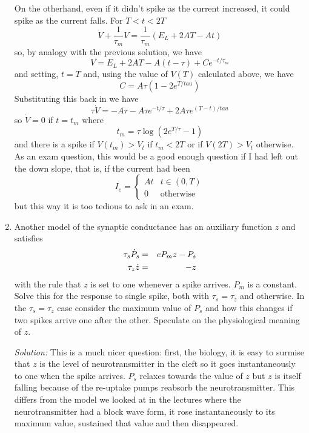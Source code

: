 \documentclass[12pt]{article}
\newcommand\soln{\noindent\textit{Solution:} }
\begin{document}
\begin{enumerate}
On the otherhand, even if it didn't spike as the current increased, it could spike as the current falls. For $T<t<2T$ 
\begin{equation}
\dot{V}+\frac{1}{\tau_m}V=\frac{1}{\tau_m}\left(E_L+2AT-At\right)
\end{equation}
so, by analogy with the previous solution, we have
\begin{equation}
V=E_L+2AT-A(t-\tau)+Ce^{-t/\tau_m}
\end{equation}
and setting, $t=T$ and, using the value of $V(T)$ calculated above, we have 
\begin{equation}
C=A\tau\left(1-2e^{T/tau}\right)
\end{equation}
Substituting this back in we have
\begin{equation}
\tau\dot{V}=-A\tau-A\tau e^{-t/\tau}+2A\tau e^{(T-t)/tau}
\end{equation}
so $\dot{V}=0$ if $t=t_m$ where
\begin{equation}
t_m=\tau\log{\left(2e^{T/\tau}-1\right)}
\end{equation}
and there is a spike if $V(t_m)>V_t$ if $t_m<2T$ or if $V(2T)>V_t$
otherwise. As an exam question, this would be a good enough question
if I had left out the down slope, that is, if the current had been
\begin{equation}
I_e=\left\{\begin{array}{ll}At&t\in(0,T)\\
0&\mbox{otherwise}
\end{array}\right.
\end{equation}
but this way it is too tedious to ask in an exam.

\item Another model of the synaptic conductance has an auxiliary function $z$ and satisfies
\begin{eqnarray}
\tau_s\dot{P}_s&=&eP_mz-P_s\cr
\tau_z\dot{z}&=&-z
\end{eqnarray}
with the rule that $z$ is set to one whenever a spike arrives. $P_m$ is a constant. Solve this for the response to single spike, both with $\tau_s=\tau_z$ and otherwise. In the $\tau_s=\tau_z$ case consider the maximum value of $P_s$ and how this changes if two spikes arrive one after the other. Speculate on the physiological meaning of $z$.

\soln This is a much nicer question: first, the biology, it is easy to surmise that $z$ is the level of neurotransmitter in the cleft so it goes instantaneously to one when the spike arrives. $P_s$ relaxes towards the value of $z$ but $z$ is itself falling because of the re-uptake pumps reabsorb the neurotransmitter. This differs from the model we looked at in the lectures where the neurotransmitter had a block wave form, it rose instantaneously to its maximum value, sustained that value and then disappeared.


\end{enumerate}
\end{document}
